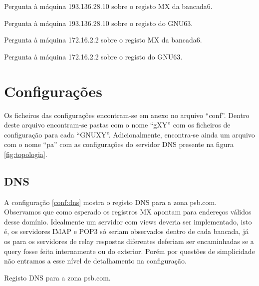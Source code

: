 \documentclass[a4paper,12pt]{article}
\begin{document}
\begin{program}
	
  \caption{Pergunta à máquina 193.136.28.10 sobre o registo MX da bancada6.}
	\label{log:193mx}
\end{program}

\begin{program}
	
  \caption{Pergunta à máquina 193.136.28.10 sobre o registo do GNU63.}
	\label{log:193a}
\end{program}

\begin{program}
	
  \caption{Pergunta à máquina 172.16.2.2 sobre o registo MX da bancada6.}
	\label{log:172mx}
\end{program}

\begin{program}
	
  \caption{Pergunta à máquina 172.16.2.2 sobre o registo do GNU63.}
	\label{log:172a}
\end{program}


\section{Configurações}

Os ficheiros das configurações encontram-se em anexo no arquivo ``conf''.
Dentro deste arquivo encontram-se pastas com o nome ``gXY'' com os ficheiros
de configuração para cada ``GNUXY''. Adicionalmente, encontra-se ainda um
arquivo com o nome ``pa'' com as configurações do servidor DNS presente na 
figura \ref{fig:topologia}.

\subsection{DNS}

A configuração \ref{conf:dns} mostra o registo DNS para a zona psb.com.
Observamos que como esperado os registros MX apontam para endereços válidos
desse domínio. Idealmente um servidor com views deveria ser implementado, isto
é, os servidores IMAP e POP3 só seriam observados dentro de cada bancada, já os
para os servidores de relay respostas diferentes deferiam ser encaminhadas se a
query fosse feita internamente ou do exterior.
Porém por questões de simplicidade não entramos a esse nível de detalhamento na
configuração.

\begin{config}
	
  \caption{Registo DNS para a zona psb.com.}
	\label{conf:dns}
\end{config}
\end{document}
